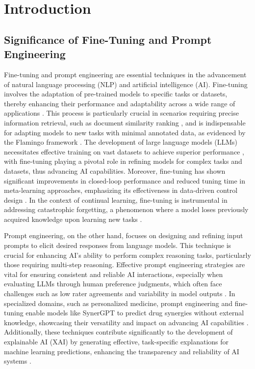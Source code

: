\section{Introduction} \label{sec:Introduction}


\subsection{Significance of Fine-Tuning and Prompt Engineering} \label{subsec:Significance of Fine-Tuning and Prompt Engineering}



Fine-tuning and prompt engineering are essential techniques in the advancement of natural language processing (NLP) and artificial intelligence (AI). Fine-tuning involves the adaptation of pre-trained models to specific tasks or datasets, thereby enhancing their performance and adaptability across a wide range of applications \cite{chowdhery2023palm}. This process is particularly crucial in scenarios requiring precise information retrieval, such as document similarity ranking \cite{ginzburg2021selfsuperviseddocumentsimilarityranking}, and is indispensable for adapting models to new tasks with minimal annotated data, as evidenced by the Flamingo framework \cite{alayrac2022flamingo}. The development of large language models (LLMs) necessitates effective training on vast datasets to achieve superior performance \cite{touvron2023llama}, with fine-tuning playing a pivotal role in refining models for complex tasks and datasets, thus advancing AI capabilities. Moreover, fine-tuning has shown significant improvements in closed-loop performance and reduced tuning time in meta-learning approaches, emphasizing its effectiveness in data-driven control design \cite{busetto2023metalearningmodelreferencedatadrivencontrol}. In the context of continual learning, fine-tuning is instrumental in addressing catastrophic forgetting, a phenomenon where a model loses previously acquired knowledge upon learning new tasks .



Prompt engineering, on the other hand, focuses on designing and refining input prompts to elicit desired responses from language models. This technique is crucial for enhancing AI's ability to perform complex reasoning tasks, particularly those requiring multi-step reasoning. Effective prompt engineering strategies are vital for ensuring consistent and reliable AI interactions, especially when evaluating LLMs through human preference judgments, which often face challenges such as low rater agreements and variability in model outputs \cite{ghosh2024comparedespairreliablepreference}. In specialized domains, such as personalized medicine, prompt engineering and fine-tuning enable models like SynerGPT to predict drug synergies without external knowledge, showcasing their versatility and impact on advancing AI capabilities \cite{edwards2023synergptincontextlearningpersonalized}. Additionally, these techniques contribute significantly to the development of explainable AI (XAI) by generating effective, task-specific explanations for machine learning predictions, enhancing the transparency and reliability of AI systems .




